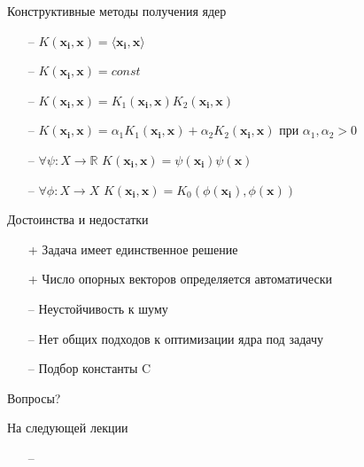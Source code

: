 \documentclass[12pt]{beamer}
\begin{document}
\begin{frame}{Конструктивные методы получения ядер}
	\begin{itemize}
		\item[--] $K(\mathbf{x_i}, \mathbf{x}) = \langle \mathbf{x_i}, \mathbf{x} \rangle$
		\item[--] $K(\mathbf{x_i}, \mathbf{x}) = const$
		\item[--] $K(\mathbf{x_i}, \mathbf{x}) = K_1(\mathbf{x_i}, \mathbf{x}) K_2(\mathbf{x_i}, \mathbf{x})$
		\item[--] $K(\mathbf{x_i}, \mathbf{x}) = \alpha_1 K_1(\mathbf{x_i}, \mathbf{x}) + \alpha_2 K_2(\mathbf{x_i}, \mathbf{x})$ при  $\alpha_1, \alpha_2 > 0$
		\item[--] $\forall \psi: X \rightarrow \mathbb{R}$ \hspace{5mm}$K(\mathbf{x_i}, \mathbf{x}) = \psi(\mathbf{x_i}) \psi(\mathbf{x})$
		\item[--] $\forall \phi: X \rightarrow X$ \hspace{5mm}$K(\mathbf{x_i}, \mathbf{x}) = K_0(\phi(\mathbf{x_i}),  \phi(\mathbf{x}))$
	\end{itemize}
\end{frame}

\begin{frame}{Достоинства и недостатки}
	\begin{itemize}[<+->]
		\item[+] Задача имеет единственное решение
		\item[+] Число опорных векторов определяется автоматически
	  \bigbreak
	
		\item[--] Неустойчивость к шуму
		\item[--] Нет общих подходов к оптимизации ядра под задачу
		\item[--] Подбор константы C
	\end{itemize}
\end{frame}

\begin{frame}[standout]
  Вопросы?
\end{frame}

\appendix

\begin{frame}{На следующей лекции}
	\begin{itemize}
    	\item[--] 
	\end{itemize}
\end{frame}
\end{document}
